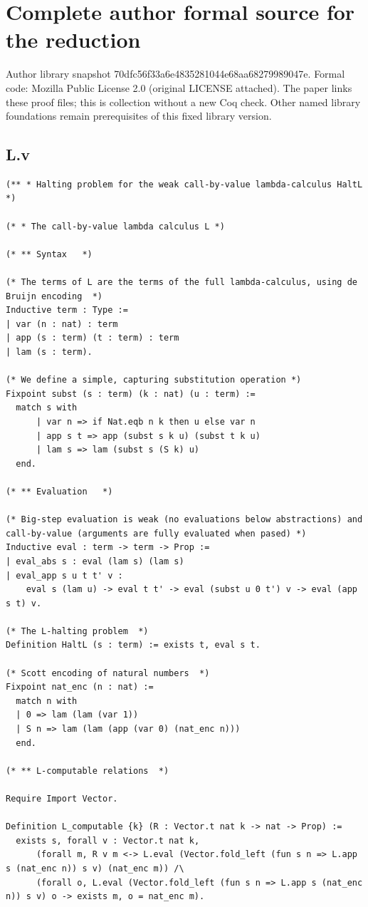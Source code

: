 \clearpage
\section*{Complete author formal source for the reduction}
Author library snapshot 70dfc56f33a6e4835281044e68aa68279989047e. Formal code: Mozilla Public License 2.0 (original LICENSE attached). The paper links these proof files; this is collection without a new Coq check. Other named library foundations remain prerequisites of this fixed library version.

\subsection*{L.v}
\begin{lstlisting}
(** * Halting problem for the weak call-by-value lambda-calculus HaltL  *)

(* * The call-by-value lambda calculus L *)

(* ** Syntax   *)

(* The terms of L are the terms of the full lambda-calculus, using de Bruijn encoding  *)
Inductive term : Type :=
| var (n : nat) : term
| app (s : term) (t : term) : term
| lam (s : term).

(* We define a simple, capturing substitution operation *)
Fixpoint subst (s : term) (k : nat) (u : term) :=
  match s with
      | var n => if Nat.eqb n k then u else var n
      | app s t => app (subst s k u) (subst t k u)
      | lam s => lam (subst s (S k) u)
  end.

(* ** Evaluation   *)

(* Big-step evaluation is weak (no evaluations below abstractions) and call-by-value (arguments are fully evaluated when pased) *)
Inductive eval : term -> term -> Prop :=
| eval_abs s : eval (lam s) (lam s)
| eval_app s u t t' v :
    eval s (lam u) -> eval t t' -> eval (subst u 0 t') v -> eval (app s t) v.

(* The L-halting problem  *)
Definition HaltL (s : term) := exists t, eval s t.

(* Scott encoding of natural numbers  *)
Fixpoint nat_enc (n : nat) := 
  match n with
  | 0 => lam (lam (var 1))
  | S n => lam (lam (app (var 0) (nat_enc n)))
  end.

(* ** L-computable relations  *)

Require Import Vector.

Definition L_computable {k} (R : Vector.t nat k -> nat -> Prop) := 
  exists s, forall v : Vector.t nat k, 
      (forall m, R v m <-> L.eval (Vector.fold_left (fun s n => L.app s (nat_enc n)) s v) (nat_enc m)) /\
      (forall o, L.eval (Vector.fold_left (fun s n => L.app s (nat_enc n)) s v) o -> exists m, o = nat_enc m).


\end{lstlisting}
